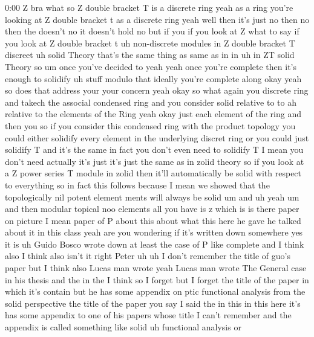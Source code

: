 \begin{unfinished}{0:00}
Z  bra  what  so  Z  double  bracket  T  is  a
discrete  ring  yeah  as  a
ring  you're  looking  at  Z  double  bracket
t  as  a  discrete  ring  yeah  well  then  it's
just  no  then  no  then  the  doesn't  no  it
doesn't  hold
no  but  if  you  if  you  look  at
Z  what  to  say  if  you  look  at  Z  double
bracket  t  uh  non-discrete
modules  in  Z  double  bracket  T  discreet
uh  solid  Theory  that's  the  same  thing  as
same  as  in  in  uh  in  ZT
solid  Theory  so
um  once  you've  decided  to
yeah  yeah  once  you're  complete  then  it's
enough  to  solidify  uh  stuff  modulo  that
ideally  you're  complete  along  okay  yeah
so  does  that  address  your  your  concern
yeah
okay  so  what  again
you  discrete  ring  and  takech  the
associal  condensed  ring  and  you  consider
solid  relative
to  to  ah  relative  to  the  elements  of  the
Ring  yeah  okay
just  each  element  of  the
ring  and  then
you  so  if  you  consider  this  condensed
ring  with  the  product  topology  you  could
either  solidify  every  element  in  the
underlying  discret  ring  or  you  could
just  solidify  T  and  it's  the
same  in  fact  you  don't  even  need  to
solidify  T  I
mean  you  don't  need  actually  it's  just
it's  just  the  same  as  in  zolid  theory  so
if  you  look  at  a  Z  power  series  T  module
in  zolid  then  it'll  automatically  be
solid  with  respect  to  everything  so  in
fact  this  follows  because  I  mean  we
showed  that  the  topologically  nil  potent
element  ments  will  always  be  solid  um
and
uh
yeah  um  and  then  modular  topical  noo
elements  all  you  have  is  z
which  is  is  there  paper
on  picture  I  mean  paper  of  P  about  this
about
what
this  here  he  gave  he  talked  about  it  in
this  class
yeah  are  you  wondering  if  it's  written
down  somewhere  yes  it  is  uh  Guido
Bosco  wrote  down  at  least  the  case  of  P
like  complete  and  I  think  also  I  think
also  isn't  it  right  Peter
uh
uh  I  don't  remember  the  title  of  guo's
paper  but  I  think  also  Lucas  man  wrote
yeah  Lucas  man  wrote  The  General  case  in
his
thesis  and  the  in
the  I  think  so  I  forget  but  I  forget  the
title  of  the  paper  in  which  it's  contain
but  he  has  some  appendix  on  ptic
functional  analysis  from  the  solid
perspective  the  title  of  the
paper  you  say  I  said  the  in  this  in  this
here  it's  has  some  appendix  to  one  of
his  papers  whose  title  I  can't  remember
and  the  appendix  is  called  something
like  solid  uh  functional  analysis  or

\end{unfinished}
